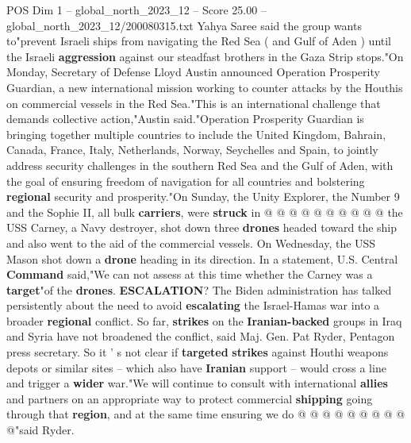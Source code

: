 \begin{textsample}{POS Dim 1 – global\_north\_2023\_12 – Score 25.00 – global\_north\_2023\_12/200080315.txt}
Yahya Saree said the group wants to"prevent Israeli ships from navigating the Red Sea ( and Gulf of Aden ) until the Israeli \textbf{aggression} against our steadfast brothers in the Gaza Strip stops."On Monday, Secretary of Defense Lloyd Austin announced Operation Prosperity Guardian, a new international mission working to counter attacks by the Houthis on commercial vessels in the Red Sea."This is an international challenge that demands collective action,"Austin said."Operation Prosperity Guardian is bringing together multiple countries to include the United Kingdom, Bahrain, Canada, France, Italy, Netherlands, Norway, Seychelles and Spain, to jointly address security challenges in the southern Red Sea and the Gulf of Aden, with the goal of ensuring freedom of navigation for all countries and bolstering \textbf{regional} security and prosperity."On Sunday, the Unity Explorer, the Number 9 and the Sophie II, all bulk \textbf{carriers}, were \textbf{struck} in @ @ @ @ @ @ @ @ @ @ the USS Carney, a Navy destroyer, shot down three \textbf{drones} headed toward the ship and also went to the aid of the commercial vessels.
On Wednesday, the USS Mason shot down a \textbf{drone} heading in its direction.
In a statement, U.S.
Central \textbf{Command} said,"We can not assess at this time whether the Carney was a \textbf{target}"of the \textbf{drones}. \textbf{ESCALATION}?
The Biden administration has talked persistently about the need to avoid \textbf{escalating} the Israel-Hamas war into a broader \textbf{regional} conflict.
So far, \textbf{strikes} on the \textbf{Iranian-backed} groups in Iraq and Syria have not broadened the conflict, said Maj.
Gen.
Pat Ryder, Pentagon press secretary.
So it ' s not clear if \textbf{targeted} \textbf{strikes} against Houthi weapons depots or similar sites -- which also have \textbf{Iranian} support -- would cross a line and trigger a \textbf{wider} war."We will continue to consult with international \textbf{allies} and partners on an appropriate way to protect commercial \textbf{shipping} going through that \textbf{region}, and at the same time ensuring we do @ @ @ @ @ @ @ @ @ @"said Ryder.

\end{textsample}
